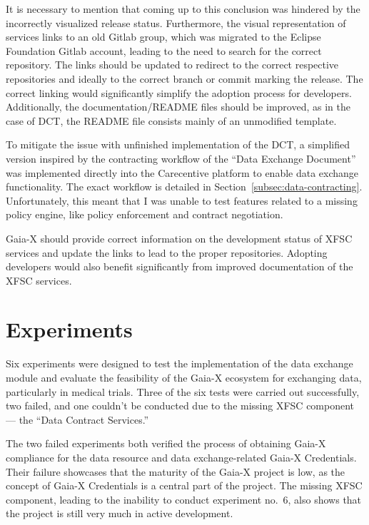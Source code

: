 It is necessary to mention that coming up to this conclusion was hindered by the incorrectly visualized release status.
Furthermore, the visual representation of services links to an old Gitlab group, which was migrated to the Eclipse Foundation Gitlab account, leading to the need to search for the correct repository.
The links should be updated to redirect to the correct respective repositories and ideally to the correct branch or commit marking the release.
The correct linking would significantly simplify the adoption process for developers.
Additionally, the documentation/README files should be improved, as in the case of DCT, the README file consists mainly of an unmodified template.

To mitigate the issue with unfinished implementation of the DCT, a simplified version inspired by the contracting workflow of the ``Data Exchange Document''~\cite{gaiax_data_exchange_document} was implemented directly into the Carecentive platform to enable data exchange functionality.
The exact workflow is detailed in Section~\ref{subsec:data-contracting}.
Unfortunately, this meant that I was unable to test features related to a missing policy engine, like policy enforcement and contract negotiation.

Gaia-X should provide correct information on the development status of XFSC services and update the links to lead to the proper repositories.
Adopting developers would also benefit significantly from improved documentation of the XFSC services.

\section{Experiments}\label{sec:experiments_discussion}

Six experiments were designed to test the implementation of the data exchange module and evaluate the feasibility of the Gaia-X ecosystem for exchanging data, particularly in medical trials.
Three of the six tests were carried out successfully, two failed, and one couldn't be conducted due to the missing XFSC component --- the ``Data Contract Services.''

The two failed experiments both verified the process of obtaining Gaia-X compliance for the data resource and data exchange-related Gaia-X Credentials.
Their failure showcases that the maturity of the Gaia-X project is low, as the concept of Gaia-X Credentials is a central part of the project.
The missing XFSC component, leading to the inability to conduct experiment no.~6, also shows that the project is still very much in active development.


